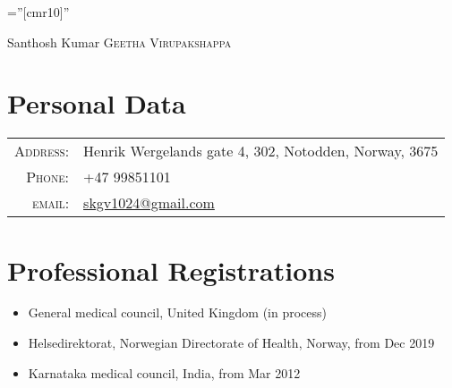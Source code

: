 \documentclass[a4paper,10pt]{article}
\begin{document}

\pagestyle{empty} %

\font\fb=''[cmr10]'' %

\par{\centering
		{\Huge Santhosh Kumar \textsc{Geetha Virupakshappa}
	}\bigskip\par}

\section{Personal Data}

\begin{tabular}{rl}
    \textsc{Address:}   & Henrik Wergelands gate 4, 302, Notodden, Norway, 3675 \\
    \textsc{Phone:}     & +47 99851101 \\
    \textsc{email:}     & \href{mailto:alessandro.plasmati@gmail.com}{skgv1024@gmail.com}
\end{tabular}

\section{Professional Registrations}
\begin{itemize}
  \item General medical council, United Kingdom (in process)
  \vspace{-0.2cm}\item Helsedirektorat, Norwegian Directorate of Health, Norway, from Dec 2019
  \vspace{-0.2cm}\item Karnataka medical council, India, from Mar 2012
\end{itemize}
\end{document}
